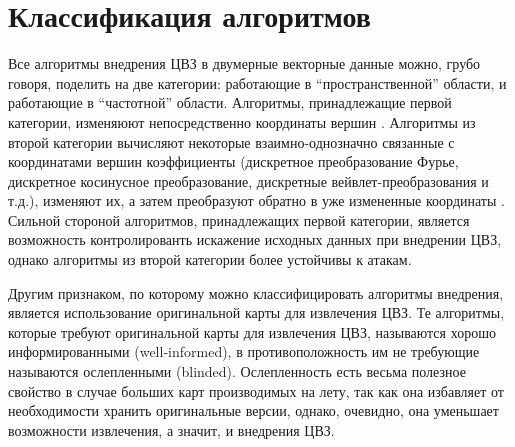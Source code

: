 \section{Классификация алгоритмов}
\label{sec:classification}
Все алгоритмы внедрения ЦВЗ в двумерные векторные данные можно, грубо говоря, поделить на две категории: 
работающие в ``пространственной'' области, и работающие в ``частотной'' области. 
Алгоритмы, принадлежащие первой категории, изменяюют непосредственно 
координаты вершин \cite{Voight, Kim, Chang, Bazin}. Алгоритмы из второй категории вычисляют некоторые 
взаимно-однозначно связанные с координатами вершин коэффициенты (дискретное преобразование Фурье, 
дискретное косинусное преобразование, дискретные вейвлет-преобразования и т.д.), изменяют их, а затем 
преобразуют обратно в уже измененные координаты \cite{Ohbuchi, Ohbuchi3D, Praun}.  
Сильной стороной алгоритмов, принадлежащих первой категории, является возможность контролированть искажение
исходных данных при внедрении ЦВЗ, однако алгоритмы из второй категории более устойчивы к атакам.

Другим признаком, по которому можно классифицировать алгоритмы внедрения, является использование 
оригинальной карты для извлечения ЦВЗ. Те алгоритмы, которые требуют оригинальной карты для извлечения ЦВЗ,
называются хорошо информированными (well-informed), в противоположность им не требующие называются ослепленными
(blinded). Ослепленность есть весьма полезное свойство в случае больших карт производимых на лету, 
так как она избавляет от необходимости хранить оригинальные версии, однако, очевидно, она уменьшает возможности
извлечения, а значит, и внедрения ЦВЗ.
